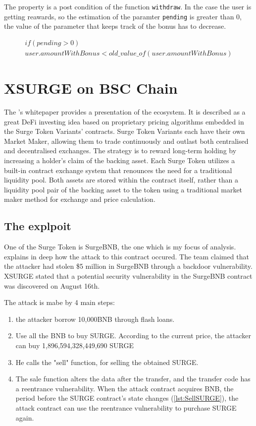The property is a post condition of the function \texttt{withdraw}. 
In the case the user is getting reawards, so the estimation of the paramter \texttt{pending} is greater than 0, the value of the parameter that keeps track of the bonus has to decrease.

\begin{equation}
    \begin{split}
        if (pending>0)
        \\ user.amountWithBonus < old\_value\_of(user.amountWithBonus)
    \end{split}
\end{equation}

\section{XSURGE on BSC Chain}   
\label{sec:Exploits:XSURGE}
The \citet{XSurgeWeb}'s whitepaper provides a presentation of the ecosystem.
It is described as a great DeFi investing idea based on proprietary pricing algorithms embedded in the Surge Token Variants' contracts.
Surge Token Variants each have their own Market Maker, allowing them to trade continuously and outlast both 
centralised and decentralised exchanges. 
The strategy is to reward long-term holding by increasing a
holder's claim of the backing asset. Each Surge Token utilizes a built-in contract exchange system that renounces the need for
a traditional liquidity pool. Both assets are stored within the contract itself, 
rather than a liquidity pool pair of the backing asset to the
token using a traditional market maker method for exchange and price calculation.

\subsection{The explpoit}
One of the Surge Token is SurgeBNB, the one which is my focus of analysis.
\citet{XSurgeBNB} explains in deep how the attack to this contract occured. 
The team claimed that the attacker had stolen \$5 million in SurgeBNB through a backdoor vulnerability.
XSURGE stated that a potential security vulnerability in the SurgeBNB contract was discovered on August 16th.

The attack is mabe by 4 main steps:
\begin{enumerate}
    \item the attacker borrow  10,000BNB through flash loans.
    \item Use all the BNB to buy SURGE. According to the current price, 
    the attacker can buy 1,896,594,328,449,690 SURGE
    \item He calls the "sell" function, for selling the obtained SURGE.
    \item The sale function alters the data after the transfer, and the transfer code has a reentrance vulnerability.
    When the attack contract acquires BNB, the period before the SURGE contract's state changes 
    (\autoref{lst:SellSURGE}), the attack contract can use the reentrance 
    vulnerability to purchase SURGE again.
\end{enumerate}

